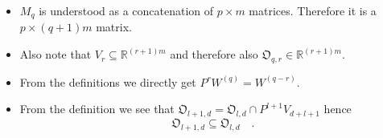 \begin{remark}{}{}
	\begin{itemize}
	\item $M_q$ is understood as a concatenation of $p\times m$ matrices. Therefore it is 
	a $p\times (q+1)m$ matrix.	
	\item	
	Also note that $V_{r}\subseteq\mathbb{R}^{(r+1)m}$ and therefore also 
	$\mathfrak{O}_{q,r} \in \mathbb{R}^{(r+1)m}$. 
	\item From the definitions we directly get $P^rW^{(q)} = W^{(q-r)}$.	
	\item From the definition we see that $\mathfrak{O}_{l+1,d} = \mathfrak{O}_{l,d} \cap 
	P^{l+1}V_{d+l+1}$ hence
	\begin{equation}
	 \mathfrak{O}_{l+1,d}\subseteq 
	\mathfrak{O}_{l,d} \quad .
	\end{equation}
	\end{itemize}
\end{remark}

